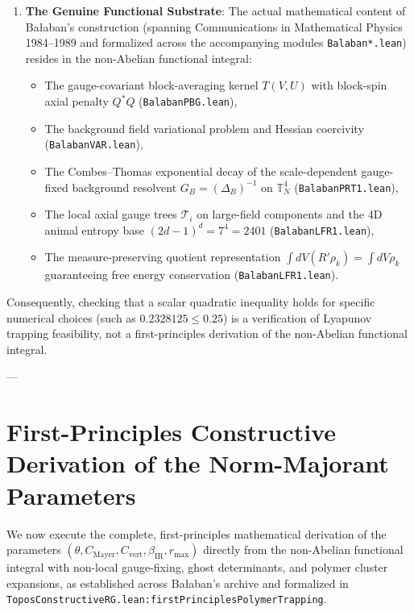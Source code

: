 \begin{warning}
\begin{enumerate}
    \item \textbf{The Genuine Functional Substrate}:
    The actual mathematical content of Ba\l aban's construction (spanning Communications in Mathematical Physics 1984--1989 and formalized across the accompanying modules \texttt{Balaban*.lean}) resides in the non-Abelian functional integral:
    \begin{itemize}
        \item The gauge-covariant block-averaging kernel $T(V, U)$ with block-spin axial penalty $Q^* Q$ (\texttt{BalabanPBG.lean}),
        \item The background field variational problem and Hessian coercivity (\texttt{BalabanVAR.lean}),
        \item The Combes--Thomas exponential decay of the scale-dependent gauge-fixed background resolvent $G_B = (\Delta_B)^{-1}$ on $\mathbb{T}_N^4$ (\texttt{BalabanPRT1.lean}),
        \item The local axial gauge trees $\mathcal{T}_i$ on large-field components and the 4D animal entropy base $(2d-1)^d = 7^4 = 2401$ (\texttt{BalabanLFR1.lean}),
        \item The measure-preserving quotient representation $\int dV (R' \rho_k) = \int dV \rho_k$ guaranteeing free energy conservation (\texttt{BalabanLFR1.lean}).
    \end{itemize}
\end{enumerate}
Consequently, checking that a scalar quadratic inequality holds for specific numerical choices (such as $0.2328125 \le 0.25$) is a verification of Lyapunov trapping feasibility, not a first-principles derivation of the non-Abelian functional integral.
\end{warning}

---

\section{First-Principles Constructive Derivation of the Norm-Majorant Parameters}
\label{sec:first_principles_derivation}

We now execute the complete, first-principles mathematical derivation of the parameters $(\theta, C_{\mathrm{Mayer}}, C_{\mathrm{vert}}, \beta_{\mathrm{IR}}, r_{\max})$ directly from the non-Abelian functional integral with non-local gauge-fixing, ghost determinants, and polymer cluster expansions, as established across Ba\l aban's archive and formalized in \texttt{ToposConstructiveRG.lean:firstPrinciplesPolymerTrapping}.

